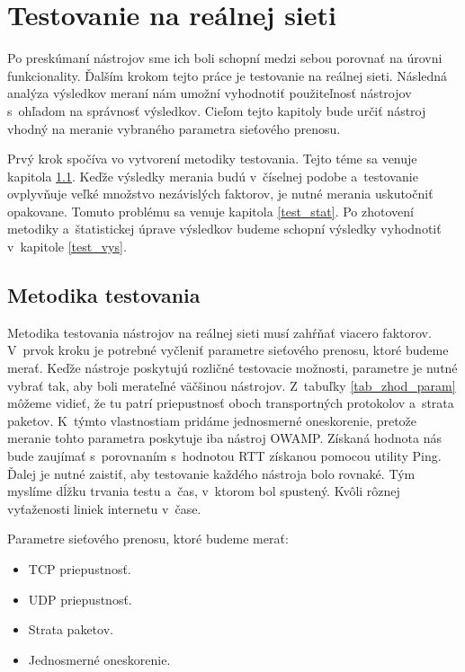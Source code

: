 \chapter{Testovanie na reálnej sieti} \label{testovanie}
Po preskúmaní nástrojov sme ich boli schopní medzi sebou
porovnať na  úrovni funkcionality.
Ďalším krokom tejto práce je testovanie na reálnej sieti. Následná
analýza výsledkov meraní nám umožní vyhodnotiť použiteľnosť nástrojov s~ohľadom na 
správnosť výsledkov. Cieľom tejto kapitoly bude určiť nástroj vhodný
na meranie vybraného parametra sieťového prenosu. 

Prvý krok spočíva vo vytvorení metodiky testovania. Tejto téme sa venuje
kapitola \ref{test_metodika}. Keďže výsledky merania budú v~číselnej podobe
a~testovanie ovplyvňuje veľké množstvo nezávislých faktorov, je nutné merania
uskutočniť opakovane. Tomuto problému sa venuje kapitola \ref{test_stat}. 
Po zhotovení metodiky a~štatistickej úprave výsledkov budeme schopní výsledky
vyhodnotiť v~kapitole \ref{test_vys}.

    \section{Metodika testovania} \label{test_metodika}
    Metodika testovania nástrojov na reálnej sieti musí zahŕňať viacero 
    faktorov. V~prvok kroku je potrebné vyčleniť parametre sieťového prenosu, 
    ktoré budeme merať. Keďže nástroje poskytujú rozličné testovacie možnosti,
    parametre je nutné vybrať tak, aby boli merateľné väčšinou nástrojov. 
    Z~tabuľky \ref{tab_zhod_param} môžeme vidieť, že tu patrí
    priepustnosť oboch transportných protokolov a~strata paketov. 
    K~týmto vlastnostiam pridáme jednosmerné oneskorenie, pretože meranie tohto 
    parametra poskytuje iba nástroj OWAMP. Získaná hodnota nás bude zaujímať
    s~porovnaním s~hodnotou RTT získanou pomocou utility Ping. 
    Ďalej je nutné zaistiť, aby testovanie každého nástroja bolo rovnaké.
    Tým myslíme dĺžku trvania testu a~čas, v~ktorom bol spustený. Kvôli rôznej
    vyťaženosti liniek internetu v~čase.

    \noindent Parametre sieťového prenosu, ktoré budeme merať:
    \begin{itemize}
        \item TCP priepustnosť.
        \item UDP priepustnosť.
        \item Strata paketov.
        \item Jednosmerné oneskorenie.
    \end{itemize}

